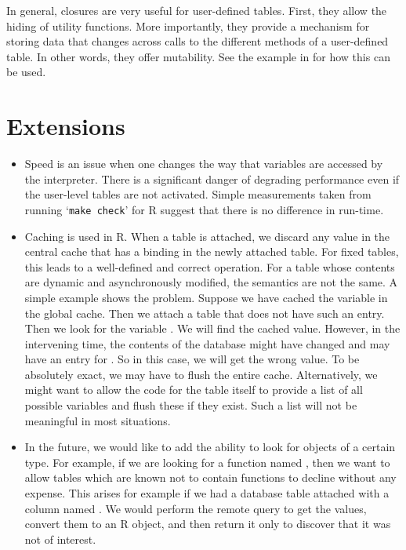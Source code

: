 \documentclass{article}
\begin{document}
In general, closures are very useful for user-defined tables. First,
they allow the hiding of utility functions.  More importantly, they
provide a mechanism for storing data that changes across calls to the
different methods of a user-defined table. In other words, they offer
mutability. See the example in  for how this can
be used.


\section{Extensions}

\begin{itemize}

\item Speed is an issue when one changes the way that variables are
  accessed by the interpreter.  There is a significant danger of
  degrading performance even if the user-level tables are not
  activated.  Simple measurements taken from running `\texttt{make
    check}' for R suggest that there is no difference in run-time.

\item Caching is used in R. When a table is attached, we discard any
value in the central cache that has a binding in the newly attached
table.  For fixed tables, this leads to a well-defined and correct
operation.  For a table whose contents are dynamic and asynchronously
modified, the semantics are not the same. A simple example shows the
problem.  Suppose we have cached the variable  in the
global cache.  Then we attach a table that does not have such an
entry.  Then we look for the variable . We will find the
cached value. However, in the intervening time, the contents of the
database might have changed and may have an entry for .
So in this case, we will get the wrong value.  To be absolutely exact,
we may have to flush the entire cache.  Alternatively, we might want
to allow the code for the table itself to provide a list of all
possible variables and flush these if they exist. Such a list will not
be meaningful in most situations.

\item 
In the future, we would like to add the ability to look for objects of
a certain type. For example, if we are looking for a function named
, then we want to allow tables which are known not to
contain functions to decline without any expense.  This arises for
example if we had a database table attached with a column named
. We would perform the remote query to get the values,
convert them to an R object, and then return it only to discover that
it was not of interest.


\end{itemize}
\end{document}
